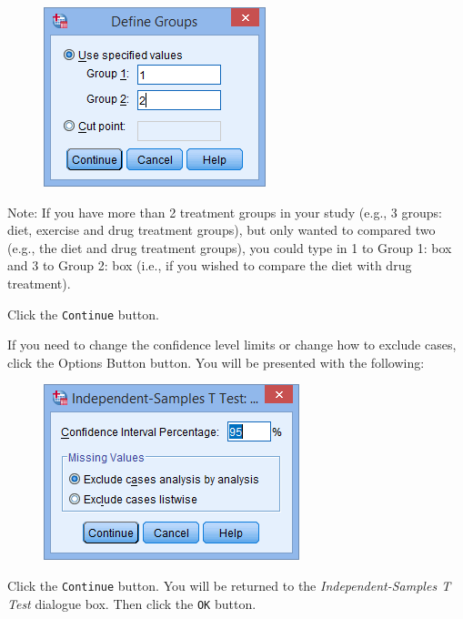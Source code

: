 \documentclass[]{article}
\begin{document}
\begin{figure}[h!]
	\centering
	\includegraphics[width=0.5\linewidth]{TwoSample/TwoSampleMenu5}

	\label{fig:TwoSampleMenu5}
\end{figure}
\begin{framed}
	Note: If you have more than 2 treatment groups in your study (e.g., 3 groups: diet, exercise and drug treatment groups), but only wanted to compared two (e.g., the diet and drug treatment groups), you could type in 1 to Group 1: box and 3 to Group 2: box (i.e., if you wished to compare the diet with drug treatment).
\end{framed}	
	Click the \texttt{Continue} button.
	
	If you need to change the confidence level limits or change how to exclude cases, click the Options Button button. You will be presented with the following:
	
\begin{figure}[h!]
	\centering
	\includegraphics[width=0.5\linewidth]{TwoSample/TwoSampleMenu6}

	\label{fig:TwoSampleMenu6}
\end{figure}
	Click the \texttt{Continue} button. You will be returned to the \textit{Independent-Samples T Test} dialogue box. Then click the \texttt{OK} button.
	
\end{document}
